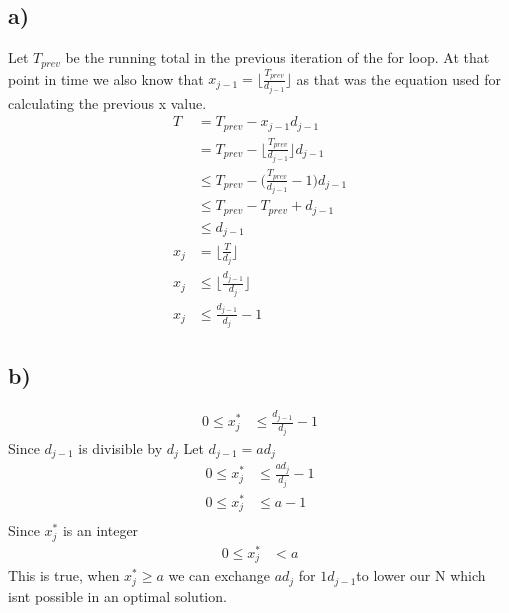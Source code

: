 \documentclass[12pt]{article}
\begin{document}
\subsection*{a)}
Let $T_{prev}$ be the running total in the previous iteration of the for loop. At that point in time we also know that $x_{j-1} = \bigg \lfloor \frac{T_{prev}}{d_{j-1}} \bigg \rfloor$ as that was the equation used for calculating the previous x value.
\begin{align*}
    T &= T_{prev} - x_{j-1} d_{j-1}\\
        &= T_{prev} - \bigg \lfloor \frac{T_{prev}}{d_{j-1}} \bigg \rfloor d_{j-1}\\
        &\leq T_{prev} - \bigg ( \frac{T_{prev}}{d_{j-1}} - 1 \bigg ) d_{j-1}\\
        &\leq T_{prev} - T_{prev} + d_{j-1}\\
        &\leq d_{j-1}\\
    x_j &= \bigg \lfloor \frac{T}{d_j} \bigg \rfloor\\
    x_j &\leq \bigg \lfloor \frac{d_{j-1}}{d_j} \bigg \rfloor\\
    x_j &\leq \frac{d_{j-1}}{d_j} - 1
\end{align*}


\subsection*{b)}
\begin{align*}
    0 \leq x_j^* & \leq \frac{d_{j-1}}{d_j} -1
\end{align*}
Since $d_{j-1}$ is divisible by $d_j$ Let $d_{j-1} = ad_j$
\begin{align*}
    0 \leq x_j^* & \leq \frac{ad_{j}}{d_j}-1 \\
    0 \leq x_j^* & \leq a - 1 \\
\end{align*}
Since $x_j^*$ is an integer
\begin{align*}
    0 \leq x_j^* & < a
\end{align*}
This is true, when $x_j^* \geq a$ we can exchange $ad_j$ for $1d_{j-1}$to lower our N which isnt possible in an optimal solution.
\end{document}
